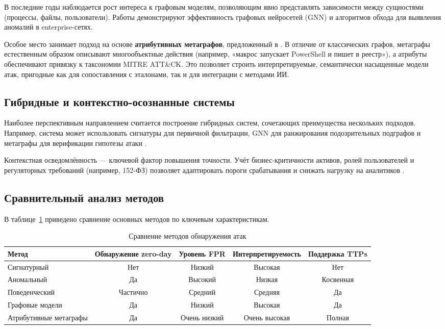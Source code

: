 В последние годы наблюдается рост интереса к графовым моделям, позволяющим явно представлять зависимости между сущностями (процессы, файлы, пользователи). Работы \cite{Raghavan2022, arXiv2023} демонстрируют эффективность графовых нейросетей (GNN) и алгоритмов обхода для выявления аномалий в enterprise-сетях.

Особое место занимает подход на основе \textbf{атрибутивных метаграфов}, предложенный в \cite{Latypov2020}. В отличие от классических графов, метаграфы естественным образом описывают многообъектные действия (например, «макрос запускает PowerShell и пишет в реестр»), а атрибуты обеспечивают привязку к таксономии MITRE ATT\&CK. Это позволяет строить интерпретируемые, семантически насыщенные модели атак, пригодные как для сопоставления с эталонами, так и для интеграции с методами ИИ.

\subsection{Гибридные и контекстно-осознанные системы}

Наиболее перспективным направлением считается построение гибридных систем, сочетающих преимущества нескольких подходов. Например, система может использовать сигнатуры для первичной фильтрации, GNN для ранжирования подозрительных подграфов и метаграфы для верификации гипотезы атаки \cite{Alazab2016}.

Контекстная осведомлённость — ключевой фактор повышения точности. Учёт бизнес-критичности активов, ролей пользователей и регуляторных требований (например, 152-ФЗ) позволяет адаптировать пороги срабатывания и снижать нагрузку на аналитиков \cite{FSTEK2015, eccu2024}.

\subsection{Сравнительный анализ методов}

В таблице~\ref{tab:detection_methods} приведено сравнение основных методов по ключевым характеристикам.

\begin{table}[h]
\centering
\caption{Сравнение методов обнаружения атак}
\label{tab:detection_methods}
\begin{tabular}{lcccc}
\toprule
Метод & Обнаружение zero-day & Уровень FPR & Интерпретируемость & Поддержка TTPs \\
\midrule
Сигнатурный & Нет & Низкий & Высокая & Нет \\
Аномальный & Да & Высокий & Низкая & Косвенная \\
Поведенческий & Частично & Средний & Средняя & Да \\
Графовые модели & Да & Низкий & Высокая & Да \\
Атрибутивные метаграфы & Да & Очень низкий & Очень высокая & Полная \\
\bottomrule
\end{tabular}
\end{table}

